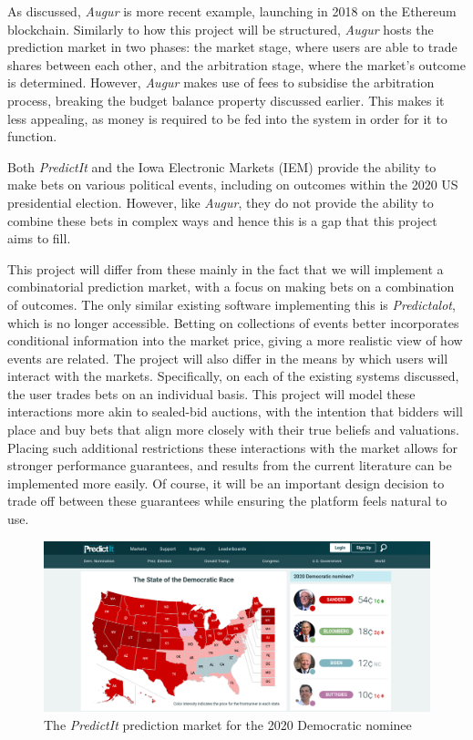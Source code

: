 \documentclass[10pt,a4paper]{article}
\theoremstyle{plain}
\theoremstyle{definition}
\begin{document}
	As discussed, \emph{Augur} is more recent example, launching in 2018 on the
	Ethereum blockchain. Similarly to how this project will be structured,
	\emph{Augur} hosts the prediction market in two phases: the market stage,
	where users are able to trade shares between each other, and the
	arbitration stage, where the market's outcome is determined. However,
	\emph{Augur} makes use of fees to subsidise the arbitration process,
	breaking the budget balance property discussed earlier. This makes it less
	appealing, as money is required to be fed into the system in order for it
	to function.

	Both \emph{PredictIt} \cite{PredictIt} and the Iowa Electronic Markets
	(IEM) \cite{IEM} provide the ability to make bets on various political
	events, including on outcomes within the 2020 US presidential election.
	However, like \emph{Augur}, they do not provide the ability to combine
	these bets in complex ways and hence this is a gap that this project aims
	to fill.

	This project will differ from these mainly in the fact that we will
	implement a combinatorial prediction market, with a focus on making bets on
	a combination of outcomes. The only similar existing software implementing
	this is \emph{Predictalot}, which is no longer accessible. Betting on
	collections of events better incorporates conditional information into the
	market price, giving a more realistic view of how events are related.  The
	project will also differ in the means by which users will interact with the
	markets. Specifically, on each of the existing systems discussed, the user
	trades bets on an individual basis. This project will model these
	interactions more akin to sealed-bid auctions, with the intention that
	bidders will place and buy bets that align more closely with their true
	beliefs and valuations. Placing such additional restrictions these
	interactions with the market allows for stronger performance guarantees,
	and results from the current literature can be implemented more easily. Of
	course, it will be an important design decision to trade off between these
	guarantees while ensuring the platform feels natural to use.

	\begin{figure}[h]
		\centering
		\includegraphics[width=.8\textwidth]{predictit.png}
		\caption{The \emph{PredictIt} prediction market for the 2020 Democratic
		nominee}
		\label{fig:predictit}
	\end{figure}
\end{document}
